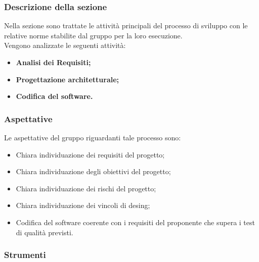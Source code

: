 \subsubsection{Descrizione della sezione} 
Nella sezione sono trattate le attività principali del processo di sviluppo con le relative norme stabilite dal gruppo \Gruppo per la loro esecuzione. \\
Vengono analizzate le seguenti attività:
\begin{itemize}
\item \textbf{Analisi dei Requisiti;}
\item \textbf{Progettazione architetturale;}
\item \textbf{Codifica del software.}
\end{itemize}

\subsubsection{Aspettative}
Le aspettative del gruppo riguardanti tale processo sono:
\begin{itemize}
\item Chiara individuazione dei requisiti del progetto;
\item Chiara individuazione degli obiettivi del progetto;
\item Chiara individuazione dei rischi del progetto;
\item Chiara individuazione dei vincoli di desing;
\item Codifica del software coerente con i requisiti del proponente che supera i test di qualità previsti.
\end{itemize}





\subsubsection{Strumenti}
\newpage
